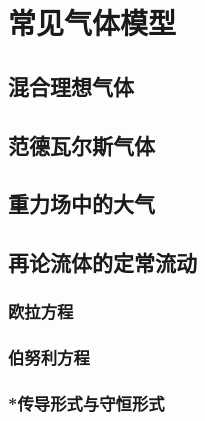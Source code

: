 

\section{常见气体模型}\label{10-4}

\subsection{混合理想气体}\label{10-4-1}

\subsection{范德瓦尔斯气体}\label{10-4-2}

\subsection{重力场中的大气}\label{10-4-3}

\subsection{再论流体的定常流动}\label{10-4-4}

\subsubsection{欧拉方程}\label{10-4-4-1}

\subsubsection{伯努利方程}\label{10-4-4-2}

\subsubsection{*传导形式与守恒形式}\label{10-4-4-3}